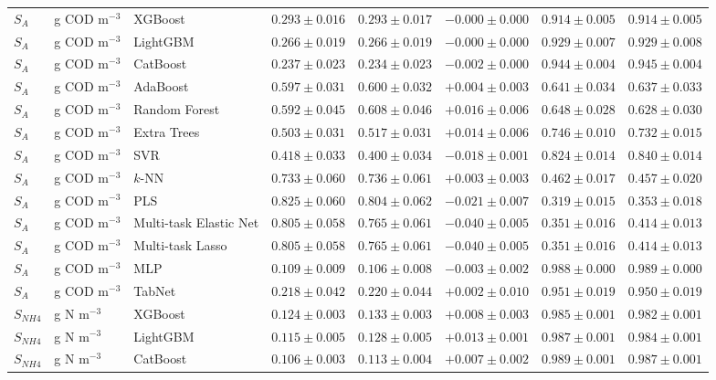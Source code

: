 \begin{longtable}{llp{3.1cm}rrrrr}
$S_{A}$ & g COD m$^{-3}$ & XGBoost & $0.293\pm0.016$ & $0.293\pm0.017$ & $-0.000\pm0.000$ & $0.914\pm0.005$ & $0.914\pm0.005$ \\
$S_{A}$ & g COD m$^{-3}$ & LightGBM & $0.266\pm0.019$ & $0.266\pm0.019$ & $-0.000\pm0.000$ & $0.929\pm0.007$ & $0.929\pm0.008$ \\
$S_{A}$ & g COD m$^{-3}$ & CatBoost & $0.237\pm0.023$ & $0.234\pm0.023$ & $-0.002\pm0.000$ & $0.944\pm0.004$ & $0.945\pm0.004$ \\
$S_{A}$ & g COD m$^{-3}$ & AdaBoost & $0.597\pm0.031$ & $0.600\pm0.032$ & $+0.004\pm0.003$ & $0.641\pm0.034$ & $0.637\pm0.033$ \\
$S_{A}$ & g COD m$^{-3}$ & Random Forest & $0.592\pm0.045$ & $0.608\pm0.046$ & $+0.016\pm0.006$ & $0.648\pm0.028$ & $0.628\pm0.030$ \\
$S_{A}$ & g COD m$^{-3}$ & Extra Trees & $0.503\pm0.031$ & $0.517\pm0.031$ & $+0.014\pm0.006$ & $0.746\pm0.010$ & $0.732\pm0.015$ \\
$S_{A}$ & g COD m$^{-3}$ & SVR & $0.418\pm0.033$ & $0.400\pm0.034$ & $-0.018\pm0.001$ & $0.824\pm0.014$ & $0.840\pm0.014$ \\
$S_{A}$ & g COD m$^{-3}$ & $k$-NN & $0.733\pm0.060$ & $0.736\pm0.061$ & $+0.003\pm0.003$ & $0.462\pm0.017$ & $0.457\pm0.020$ \\
$S_{A}$ & g COD m$^{-3}$ & PLS & $0.825\pm0.060$ & $0.804\pm0.062$ & $-0.021\pm0.007$ & $0.319\pm0.015$ & $0.353\pm0.018$ \\
$S_{A}$ & g COD m$^{-3}$ & Multi-task Elastic Net & $0.805\pm0.058$ & $0.765\pm0.061$ & $-0.040\pm0.005$ & $0.351\pm0.016$ & $0.414\pm0.013$ \\
$S_{A}$ & g COD m$^{-3}$ & Multi-task Lasso & $0.805\pm0.058$ & $0.765\pm0.061$ & $-0.040\pm0.005$ & $0.351\pm0.016$ & $0.414\pm0.013$ \\
$S_{A}$ & g COD m$^{-3}$ & MLP & $0.109\pm0.009$ & $0.106\pm0.008$ & $-0.003\pm0.002$ & $0.988\pm0.000$ & $0.989\pm0.000$ \\
$S_{A}$ & g COD m$^{-3}$ & TabNet & $0.218\pm0.042$ & $0.220\pm0.044$ & $+0.002\pm0.010$ & $0.951\pm0.019$ & $0.950\pm0.019$ \\
$S_{NH4}$ & g N m$^{-3}$ & XGBoost & $0.124\pm0.003$ & $0.133\pm0.003$ & $+0.008\pm0.003$ & $0.985\pm0.001$ & $0.982\pm0.001$ \\
$S_{NH4}$ & g N m$^{-3}$ & LightGBM & $0.115\pm0.005$ & $0.128\pm0.005$ & $+0.013\pm0.001$ & $0.987\pm0.001$ & $0.984\pm0.001$ \\
$S_{NH4}$ & g N m$^{-3}$ & CatBoost & $0.106\pm0.003$ & $0.113\pm0.004$ & $+0.007\pm0.002$ & $0.989\pm0.001$ & $0.987\pm0.001$ \\

\end{longtable}
